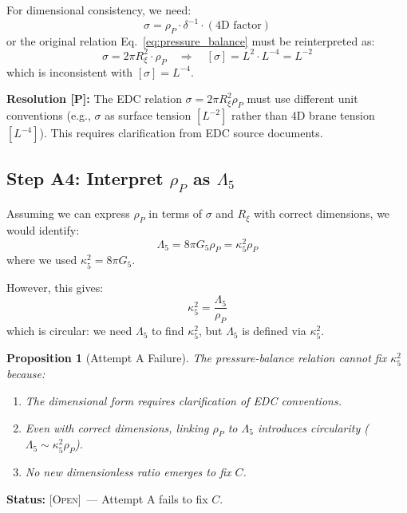 \documentclass[11pt,a4paper]{article}
\newtheorem{proposition}{Proposition}
\theoremstyle{definition}
\newcommand{\Post}{\textsc{[P]}}
\newcommand{\Open}{\textsc{[Open]}}
\begin{document}
For dimensional consistency, we need:
\begin{equation}
\sigma = \rho_P \cdot \delta^{-1} \cdot (\text{4D factor})
\end{equation}
or the original relation Eq.~\eqref{eq:pressure_balance} must be reinterpreted as:
\begin{equation}
\sigma = 2\pi R_\xi^2 \cdot \rho_P \quad \Rightarrow \quad [\sigma] = L^2 \cdot L^{-4} = L^{-2}
\end{equation}
which is inconsistent with $[\sigma] = L^{-4}$.

\textbf{Resolution \Post:} The EDC relation $\sigma = 2\pi R_\xi^2 \rho_P$ must use
different unit conventions (e.g., $\sigma$ as surface tension $[L^{-2}]$ rather than
4D brane tension $[L^{-4}]$). This requires clarification from EDC source documents.

\subsection{Step A4: Interpret $\rho_P$ as $\Lambda_5$}

Assuming we can express $\rho_P$ in terms of $\sigma$ and $R_\xi$ with correct dimensions,
we would identify:
\begin{equation}
\Lambda_5 = 8\pi G_5 \rho_P = \kappa_5^2 \rho_P
\end{equation}
where we used $\kappa_5^2 = 8\pi G_5$.

However, this gives:
\begin{equation}
\kappa_5^2 = \frac{\Lambda_5}{\rho_P}
\end{equation}
which is circular: we need $\Lambda_5$ to find $\kappa_5^2$, but $\Lambda_5$ is
defined via $\kappa_5^2$.

\begin{proposition}[Attempt A Failure]
The pressure-balance relation cannot fix $\kappa_5^2$ because:
\begin{enumerate}
\item The dimensional form requires clarification of EDC conventions.
\item Even with correct dimensions, linking $\rho_P$ to $\Lambda_5$ introduces
circularity ($\Lambda_5 \sim \kappa_5^2 \rho_P$).
\item No new dimensionless ratio emerges to fix $C$.
\end{enumerate}
\end{proposition}

\textbf{Status:} \Open\ --- Attempt A fails to fix $C$.
\end{document}
